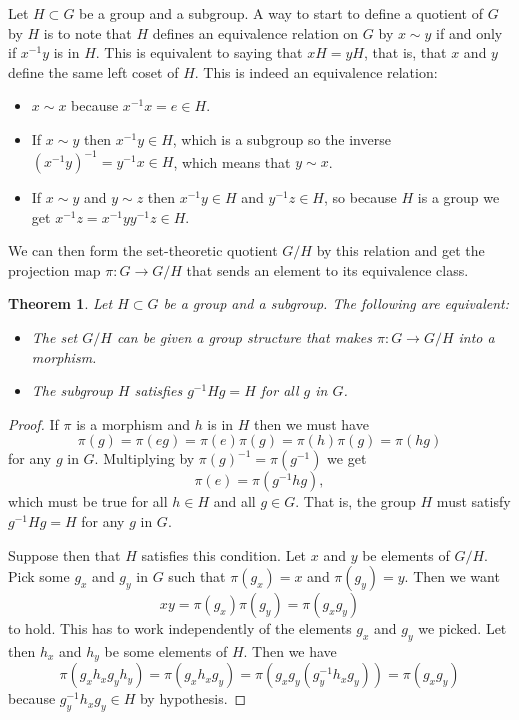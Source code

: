 \documentclass[11pt]{article}
\newtheorem{theo}{Theorem}
\theoremstyle{definition}
\begin{document}
Let $H \subset G$ be a group and a subgroup.
A way to start to define a quotient of $G$ by $H$ is to note that $H$ defines
an equivalence relation on $G$ by $x \sim y$ if and only if $x^{-1}y$ is in
$H$.
This is equivalent to saying that $x H = y H$, that is, that $x$ and $y$ define
the same left coset of $H$.
This is indeed an equivalence relation:
\begin{itemize}
\item
$x \sim x$ because $x^{-1} x = e \in H$.

\item
If $x \sim y$ then $x^{-1} y \in H$, which is a subgroup so the inverse
$(x^{-1} y)^{-1} = y^{-1} x \in H$, which means that $y \sim x$.

\item
If $x \sim y$ and $y \sim z$ then $x^{-1}y \in H$ and $y^{-1} z \in H$, so
because $H$ is a group we get $x^{-1} z = x^{-1} y y^{-1} z \in H$.
\end{itemize}
We can then form the set-theoretic quotient $G/H$ by this relation and get the
projection map $\pi : G \to G/H$ that sends an element to its equivalence class.



\begin{theo}
Let $H \subset G$ be a group and a subgroup.
The following are equivalent:
\begin{itemize}
\item
The set $G / H$ can be given a group structure that makes $\pi : G \to G/H$
into a morphism.

\item
The subgroup $H$ satisfies $g^{-1} H g = H$ for all $g$ in $G$.
\end{itemize}
\end{theo}

\begin{proof}
If $\pi$ is a morphism
and $h$ is in $H$ then we must have
$$
\pi(g) 
= \pi(eg)
= \pi(e) \pi(g)
= \pi(h) \pi(g)
= \pi(hg)
$$
for any $g$ in $G$.
Multiplying by $\pi(g)^{-1} = \pi(g^{-1})$ we get
$$
\pi(e) = \pi(g^{-1} h g),
$$
which must be true for all $h \in H$ and all $g \in G$.
That is, the group $H$ must satisfy $g^{-1} H g = H$ for any $g$ in $G$.


Suppose then that $H$ satisfies this condition.
Let $x$ and $y$ be elements of $G/H$.
Pick some $g_x$ and $g_y$ in $G$ such that $\pi(g_x) = x$ and $\pi(g_y) = y$.
Then we want
$$
xy = \pi(g_x) \pi(g_y) = \pi(g_x g_y)
$$
to hold.
This has to work independently of the elements $g_x$ and $g_y$ we picked.
Let then $h_x$ and $h_y$ be some elements of $H$.
Then we have
$$
\pi(g_x h_x g_y h_y)
= \pi(g_x h_x g_y)
= \pi(g_x g_y (g_y^{-1} h_x g_y))
= \pi(g_x g_y)
$$
because $g_y^{-1} h_x g_y \in H$ by hypothesis.
\end{proof}
\end{document}
